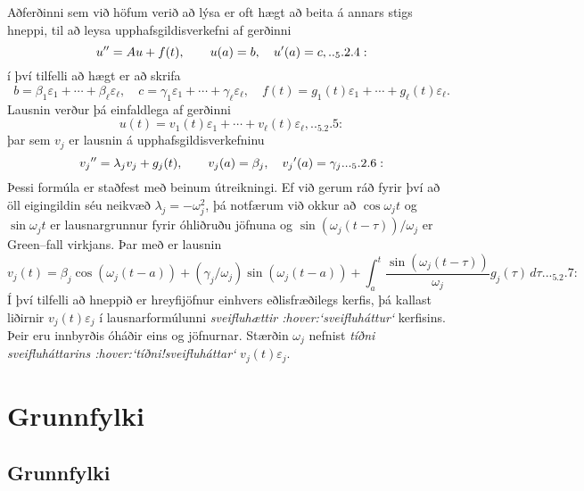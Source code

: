 Aðferðinni sem við höfum verið að lýsa er oft hægt að beita á annars
stigs hneppi, til að leysa upphafsgildisverkefni af gerðinni
 \begin{equation*}u\ddash=Au+f(t), \qquad u(a)=b, \quad u\dash(a)=c,


.. _5.2.4:

 \end{equation*}
í því tilfelli að hægt er að skrifa 
 $$b=\beta_1\varepsilon_1+\cdots+\beta_\ell\varepsilon_\ell, \quad
c=\gamma_1\varepsilon_1+\cdots+\gamma_\ell\varepsilon_\ell,\quad
f(t)=g_1(t)\varepsilon_1+\cdots+g_\ell(t)\varepsilon_\ell.
 $$
Lausnin verður þá einfaldlega af gerðinni
 \begin{equation*}u(t)=v_1(t)\varepsilon_1+\cdots+v_\ell(t)\varepsilon_\ell,


.. _5.2.5:

 \end{equation*}
þar sem $v_j$ er lausnin á upphafsgildisverkefninu
 \begin{equation*}v_j\ddash=\lambda_j v_j +g_j(t), \qquad v_j(a)=\beta_j, \quad
v_j\dash(a)=\gamma_j. 


.. _5.2.6:

 \end{equation*}
Þessi formúla er staðfest með beinum útreikningi.
Ef við gerum ráð fyrir því að öll eigingildin séu neikvæð
$\lambda_j=-\omega_j^2$, þá notfærum við okkur að
$\cos {\omega}_j t$ og $\sin {\omega}_jt$ er lausnargrunnur fyrir 
óhliðruðu jöfnuna og $\sin({\omega}_j(t-{\tau}))/{\omega}_j$ er
Green--fall virkjans.  Þar með er lausnin
 \begin{equation*}v_j(t)=\beta_j \cos(\omega_j(t-a))+
(\gamma_j/\omega_j)\sin (\omega_j(t-a)) +
\int_a^t\dfrac{\sin (\omega_j(t-\tau))}{\omega_j}g_j(\tau) \, d\tau. 


.. _5.2.7:

 \end{equation*}
Í því tilfelli að hneppið er hreyfijöfnur einhvers
eðlisfræðilegs kerfis, þá kallast liðirnir $v_j(t)\varepsilon_j$ í
lausnarformúlunni  {\it sveifluhættir :hover:`sveifluháttur`} kerfisins.  Þeir eru
innbyrðis óháðir eins og jöfnurnar.  Stærðin 
${\omega}_j$ nefnist {\it tíðni
sveifluháttarins :hover:`tíðni!sveifluháttar`} $v_j(t)\varepsilon_j$.

 
\section{Grunnfylki}

\subsection{Grunnfylki}

